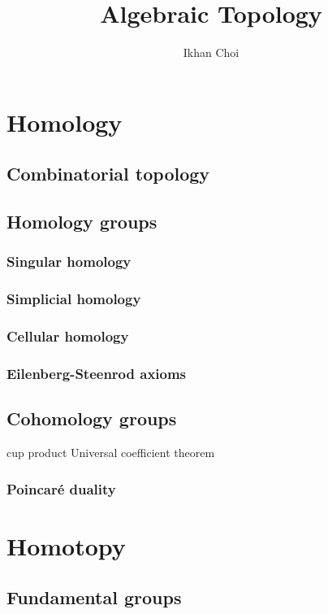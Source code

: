 \documentclass{../note}
\begin{document}
\title{Algebraic Topology}
\author{Ikhan Choi}
\maketitle
\tableofcontents


\part{Homology}
\chapter{Combinatorial topology}

\chapter{Homology groups}
\section{Singular homology}
\section{Simplicial homology}
\section{Cellular homology}
\section{Eilenberg-Steenrod axioms}

\chapter{Cohomology groups}

cup product
Universal coefficient theorem

\section{Poincar\'e duality}





\part{Homotopy}
\chapter{Fundamental groups}
\end{document}
